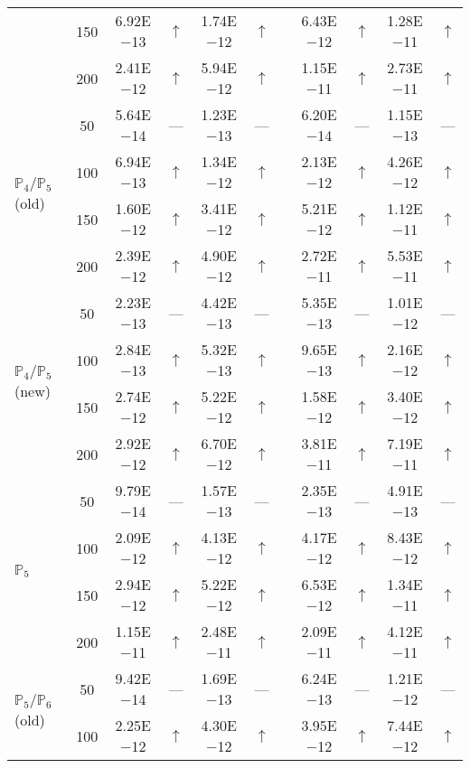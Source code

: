 \begin{table}[H]
{\begin{tabular}{@{}l c c c c c c c c c c@{}}
 & 150 & 6.92E$-$13 & $\uparrow$  & 1.74E$-$12 & $\uparrow$ &  & 6.43E$-$12 & $\uparrow$ & 1.28E$-$11 & $\uparrow$\\
 & 200 & 2.41E$-$12 & $\uparrow$  & 5.94E$-$12 & $\uparrow$ &  & 1.15E$-$11 & $\uparrow$ & 2.73E$-$11 & $\uparrow$\\
\midrule
\multirow{4}{*}{$\mathbb{P}_{4}/\mathbb{P}_{5}$ (old)}
 & 50 & 5.64E$-$14 & ---  & 1.23E$-$13 & --- &  & 6.20E$-$14 & --- & 1.15E$-$13 & ---\\
 & 100 & 6.94E$-$13 & $\uparrow$  & 1.34E$-$12 & $\uparrow$ &  & 2.13E$-$12 & $\uparrow$ & 4.26E$-$12 & $\uparrow$\\
 & 150 & 1.60E$-$12 & $\uparrow$  & 3.41E$-$12 & $\uparrow$ &  & 5.21E$-$12 & $\uparrow$ & 1.12E$-$11 & $\uparrow$\\
 & 200 & 2.39E$-$12 & $\uparrow$  & 4.90E$-$12 & $\uparrow$ &  & 2.72E$-$11 & $\uparrow$ & 5.53E$-$11 & $\uparrow$\\
\midrule
\multirow{4}{*}{$\mathbb{P}_{4}/\mathbb{P}_{5}$ (new)}
 & 50 & 2.23E$-$13 & ---  & 4.42E$-$13 & --- &  & 5.35E$-$13 & --- & 1.01E$-$12 & ---\\
 & 100 & 2.84E$-$13 & $\uparrow$  & 5.32E$-$13 & $\uparrow$ &  & 9.65E$-$13 & $\uparrow$ & 2.16E$-$12 & $\uparrow$\\
 & 150 & 2.74E$-$12 & $\uparrow$  & 5.22E$-$12 & $\uparrow$ &  & 1.58E$-$12 & $\uparrow$ & 3.40E$-$12 & $\uparrow$\\
 & 200 & 2.92E$-$12 & $\uparrow$  & 6.70E$-$12 & $\uparrow$ &  & 3.81E$-$11 & $\uparrow$ & 7.19E$-$11 & $\uparrow$\\
\midrule
\multirow{4}{*}{$\mathbb{P}_{5}$}
 & 50 & 9.79E$-$14 & ---  & 1.57E$-$13 & --- &  & 2.35E$-$13 & --- & 4.91E$-$13 & ---\\
 & 100 & 2.09E$-$12 & $\uparrow$  & 4.13E$-$12 & $\uparrow$ &  & 4.17E$-$12 & $\uparrow$ & 8.43E$-$12 & $\uparrow$\\
 & 150 & 2.94E$-$12 & $\uparrow$  & 5.22E$-$12 & $\uparrow$ &  & 6.53E$-$12 & $\uparrow$ & 1.34E$-$11 & $\uparrow$\\
 & 200 & 1.15E$-$11 & $\uparrow$  & 2.48E$-$11 & $\uparrow$ &  & 2.09E$-$11 & $\uparrow$ & 4.12E$-$11 & $\uparrow$\\
\midrule
\multirow{4}{*}{$\mathbb{P}_{5}/\mathbb{P}_{6}$ (old)}
 & 50 & 9.42E$-$14 & ---  & 1.69E$-$13 & --- &  & 6.24E$-$13 & --- & 1.21E$-$12 & ---\\
 & 100 & 2.25E$-$12 & $\uparrow$  & 4.30E$-$12 & $\uparrow$ &  & 3.95E$-$12 & $\uparrow$ & 7.44E$-$12 & $\uparrow$\\

\end{tabular}}
\end{table}
